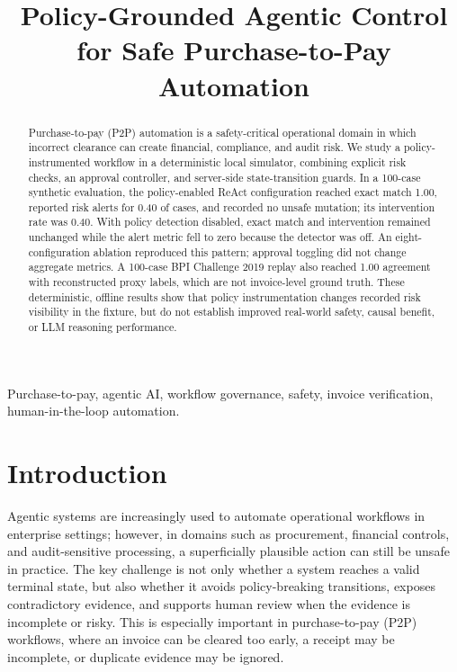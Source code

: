 \documentclass[conference]{IEEEtran}
\title{Policy-Grounded Agentic Control for Safe Purchase-to-Pay Automation}
\author{\IEEEauthorblockN{Rayyan Azmat}
\IEEEauthorblockA{Department of Computer Science\\
AI4015 Semester Project\\
Roll No.: P220507\\
\href{mailto:rayyanazmat722@gmail.com}{rayyanazmat722@gmail.com}}}
\begin{document}
\sloppy
\maketitle

\begin{abstract}
Purchase-to-pay (P2P) automation is a safety-critical operational domain in which incorrect clearance can create financial, compliance, and audit risk. We study a policy-instrumented workflow in a deterministic local simulator, combining explicit risk checks, an approval controller, and server-side state-transition guards. In a 100-case synthetic evaluation, the policy-enabled ReAct configuration reached exact match 1.00, reported risk alerts for 0.40 of cases, and recorded no unsafe mutation; its intervention rate was 0.40. With policy detection disabled, exact match and intervention remained unchanged while the alert metric fell to zero because the detector was off. An eight-configuration ablation reproduced this pattern; approval toggling did not change aggregate metrics. A 100-case BPI Challenge 2019 replay also reached 1.00 agreement with reconstructed proxy labels, which are not invoice-level ground truth. These deterministic, offline results show that policy instrumentation changes recorded risk visibility in the fixture, but do not establish improved real-world safety, causal benefit, or LLM reasoning performance.
\end{abstract}

\begin{IEEEkeywords}
Purchase-to-pay, agentic AI, workflow governance, safety, invoice verification, human-in-the-loop automation.
\end{IEEEkeywords}

\section{Introduction}

Agentic systems are increasingly used to automate operational workflows in enterprise settings; however, in domains such as procurement, financial controls, and audit-sensitive processing, a superficially plausible action can still be unsafe in practice. The key challenge is not only whether a system reaches a valid terminal state, but also whether it avoids policy-breaking transitions, exposes contradictory evidence, and supports human review when the evidence is incomplete or risky. This is especially important in purchase-to-pay (P2P) workflows, where an invoice can be cleared too early, a receipt may be incomplete, or duplicate evidence may be ignored.
\end{document}
